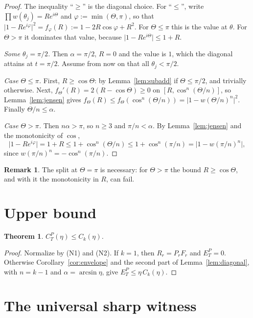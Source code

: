 \documentclass[11pt]{amsart}
\newtheorem{theorem}{Theorem}[section]
\theoremstyle{definition}
\newtheorem*{remark}{Remark}
\newcommand{\abs}[1]{\lvert #1\rvert}
\begin{document}
\begin{proof}
The inequality ``$\ge$'' is the diagonal choice. For ``$\le$'', write
$\prod w(\theta_j)=Re^{i\Theta}$ and $\varphi:=\min(\Theta,\pi)$, so that
$\abs{1-Re^{i\varphi}}^2=f_\varphi(R):=1-2R\cos\varphi+R^2$. For $\Theta\le\pi$ this is
the value at $\theta$. For $\Theta>\pi$ it dominates that value, because
$\abs{1-Re^{i\Theta}}\le1+R$.

\emph{Some $\theta_j=\pi/2$.} Then $\alpha=\pi/2$, $R=0$ and the value is $1$, which the
diagonal attains at $t=\pi/2$. Assume from now on that all $\theta_j<\pi/2$.

\emph{Case $\Theta\le\pi$.} First, $R\ge\cos\Theta$: by Lemma~\ref{lem:subadd} if
$\Theta\le\pi/2$, and trivially otherwise. Next, $f_\Theta'(R)=2(R-\cos\Theta)\ge0$ on
$[R,\cos^n(\Theta/n)]$, so Lemma~\ref{lem:jensen} gives
$f_\Theta(R)\le f_\Theta(\cos^n(\Theta/n))=\abs{1-w(\Theta/n)^n}^2$. Finally
$\Theta/n\le\alpha$.

\emph{Case $\Theta>\pi$.} Then $n\alpha>\pi$, so $n\ge3$ and $\pi/n<\alpha$. By
Lemma~\ref{lem:jensen} and the monotonicity of $\cos$,
\[
\abs{1-Re^{i\varphi}}=1+R\le1+\cos^n(\Theta/n)\le1+\cos^n(\pi/n)=\abs{1-w(\pi/n)^n},
\]
since $w(\pi/n)^n=-\cos^n(\pi/n)$.
\end{proof}

\begin{remark}
The split at $\Theta=\pi$ is necessary: for $\Theta>\pi$ the bound $R\ge\cos\Theta$,
and with it the monotonicity in $R$, can fail.
\end{remark}

\section{Upper bound}\label{sec:upper}

\begin{theorem}\label{thm:upper}
$C^P_T(\eta)\le C_k(\eta)$.
\end{theorem}

\begin{proof}
Normalize by (N1) and (N2). If $k=1$, then $R_r=P_rF_r$ and $E^P_T=0$. Otherwise
Corollary~\ref{cor:envelope} and the second part of Lemma~\ref{lem:diagonal}, with
$n=k-1$ and $\alpha=\arcsin\eta$, give $E^P_T\le\eta\,C_k(\eta)$.
\end{proof}

\section{The universal sharp witness}\label{sec:witness}
\end{document}
